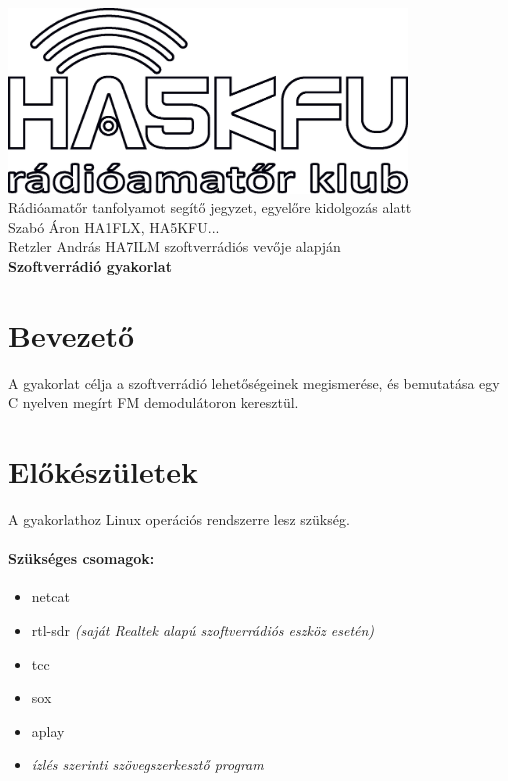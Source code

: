 \documentclass[12pt,a4paper]{article}
\begin{document}
\begin{center}
\includegraphics[width=300pt,keepaspectratio]{figures/ha5kfu.eps}
\\[0.5cm]
Rádióamatőr tanfolyamot segítő jegyzet, egyelőre kidolgozás alatt \\
Szabó Áron HA1FLX, HA5KFU... %
\\
Retzler András HA7ILM szoftverrádiós vevője alapján
\\[1cm]

{\huge \bfseries Szoftverrádió gyakorlat \\[2cm]}



\end{center}

\renewcommand{\contentsname}{Tartalom}\tableofcontents 
\newpage

\newpage

\section{Bevezető}
A gyakorlat célja a szoftverrádió lehetőségeinek megismerése, és bemutatása egy C nyelven megírt FM demodulátoron keresztül.

\section{Előkészületek}
A gyakorlathoz Linux operációs rendszerre lesz szükség.

\paragraph{Szükséges csomagok:} 
\begin{itemize}
	\item netcat
	\item rtl-sdr \textit{(saját Realtek alapú szoftverrádiós eszköz esetén)}
	\item tcc
	\item sox
	\item aplay
	\item \textit{ízlés szerinti szövegszerkesztő program }

\end{itemize}
\end{document}

